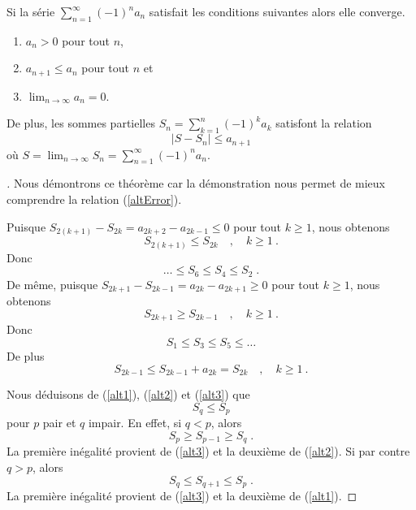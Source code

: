 {\begin{focus}{\thm}
Si la série $\displaystyle \sum_{n=1}^\infty (-1)^n a_n$ satisfait les
conditions suivantes alors elle converge.
\begin{enumerate}
\item $a_n >0$ pour tout $n$,
\item $a_{n+1} \leq a_n$ pour tout $n$ et
\item $\displaystyle \lim_{n\rightarrow \infty} a_n = 0$.
\end{enumerate}
De plus, les sommes partielles
$\displaystyle S_n = \sum_{k=1}^n (-1)^k a_k$ satisfont la relation
\begin{equation}\label{altError}
 | S - S_n | \leq a_{n+1}
\end{equation}
où $\displaystyle S = \lim_{n\rightarrow \infty} S_n
= \sum_{n=1}^\infty (-1)^n a_n$.
\label{altTest}
\end{focus}

\begin{proof}[\theory]
Nous démontrons ce théorème car la démonstration nous permet de mieux
comprendre la relation (\ref{altError}).

Puisque $S_{2(k+1)} - S_{2k} = a_{2k+2} - a_{2k-1} \leq 0$ pour tout
$k\geq 1$, nous obtenons
\begin{equation}\label{alt1}
S_{2(k+1)} \leq S_{2k} \quad , \quad k\geq 1 \ .
\end{equation}
Donc
\[
\ldots \leq S_6 \leq S_4 \leq S_2 \; .
\]
De même, puisque $S_{2k+1} - S_{2k-1} = a_{2k} - a_{2k+1} \geq 0$ pour
tout $k\geq 1$, nous obtenons
\begin{equation}\label{alt2}
S_{2k+1} \geq S_{2k-1} \quad , \quad  k\geq 1 \ .
\end{equation}
Donc
\[
S_1 \leq S_3 \leq S_5 \leq \ldots
\]
De plus
\begin{equation}\label{alt3}
S_{2k-1} \leq S_{2k-1} + a_{2k} = S_{2k} \quad , \quad k \geq 1 \ .
\end{equation}

Nous déduisons de (\ref{alt1}), (\ref{alt2}) et (\ref{alt3}) que
\begin{equation}\label{alt4}
S_q \leq S_p
\end{equation}
pour $p$ pair et $q$ impair.  En effet, si $q < p$, alors
\[
S_p \geq S_{p-1} \geq S_q \; .
\]
La première inégalité provient de (\ref{alt3}) et la deuxième de
(\ref{alt2}).  Si par contre $q>p$, alors
\[
S_q \leq S_{q+1} \leq S_p \; .
\]
La première inégalité provient de (\ref{alt3}) et la deuxième de
(\ref{alt1}).


\end{proof}}
